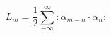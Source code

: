 \begin{equation}
L_{m}=\frac{1}{2}\sum_{-\infty }^{\infty }:\alpha _{m-n}\cdot \alpha _{n}: 
\tag{4}
\end{equation}%
